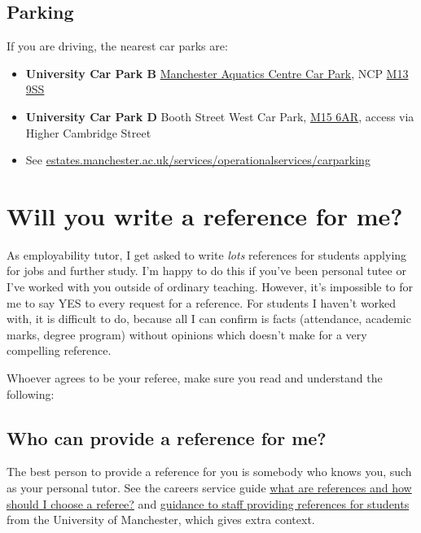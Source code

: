 \documentclass[
  12pt,
]{book}
\providecommand{\tightlist}{%
  \setlength{\itemsep}{0pt}\setlength{\parskip}{0pt}}
\begin{document}
\hypertarget{parking}{%
\section{Parking}\label{parking}}

If you are driving, the nearest car parks are:

\begin{itemize}
\tightlist
\item
  \textbf{University Car Park B} \href{https://www.ncp.co.uk/find-a-car-park/car-parks/manchester-aquatic-centre-jv/}{Manchester Aquatics Centre Car Park}, NCP \href{http://maps.google.co.uk/maps?q=M13+9SS}{M13 9SS}
\item
  \textbf{University Car Park D} Booth Street West Car Park, \href{http://maps.google.co.uk/maps?q=M15+6AR}{M15 6AR}, access via Higher Cambridge Street
\item
  See \href{https://www.estates.manchester.ac.uk/services/operationalservices/carparking/}{estates.manchester.ac.uk/services/operationalservices/carparking}
\end{itemize}

\hypertarget{appendix-appendix}{%
\appendix}


\hypertarget{referee}{%
\chapter{Will you write a reference for me?}\label{referee}}

As employability tutor, I get asked to write \emph{lots} references for students applying for jobs and further study. I'm happy to do this if you've been personal tutee or I've worked with you outside of ordinary teaching. However, it's impossible to for me to say YES to every request for a reference. For students I haven't worked with, it is difficult to do, because all I can confirm is facts (attendance, academic marks, degree program) without opinions which doesn't make for a very compelling reference.

Whoever agrees to be your referee, make sure you read and understand the following:

\hypertarget{who-can-provide-a-reference-for-me}{%
\section{Who can provide a reference for me?}\label{who-can-provide-a-reference-for-me}}

The best person to provide a reference for you is somebody who knows you, such as your personal tutor. See the careers service guide \href{http://www.careers.manchester.ac.uk/applicationsinterviews/faqs/references}{what are references and how should I choose a referee?} and \href{http://documents.manchester.ac.uk/display.aspx?DocID=1921}{guidance to staff providing references for students} from the University of Manchester, which gives extra context.
\end{document}
